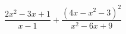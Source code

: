 \begin{ex}[type=expression]
	\begin{condition}
		\( \dfrac{2x^2-3x+1}{x-1}+\dfrac{(4x-x^2-3)^2}{x^2-6x+9} \)
	\end{condition}
\end{ex}